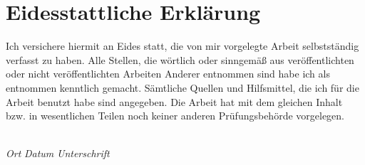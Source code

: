\chapter*{Eidesstattliche Erklärung}

Ich versichere hiermit an Eides statt, die von mir vorgelegte Arbeit selbstständig verfasst zu haben. Alle Stellen, die wörtlich oder sinngemäß aus veröffentlichten oder nicht veröffentlichten Arbeiten Anderer entnommen sind habe ich als entnommen kenntlich gemacht. Sämtliche Quellen und Hilfsmittel, die ich für die Arbeit benutzt habe sind angegeben. Die Arbeit hat mit dem gleichen Inhalt bzw. in wesentlichen Teilen noch keiner anderen Prüfungsbehörde vorgelegen.
\vspace{4cm}

 
\hrulefill\hspace*{6.0cm}\\
\textit{Ort} \hspace{1cm} \textit{Datum} \hspace{1cm} \textit{Unterschrift}